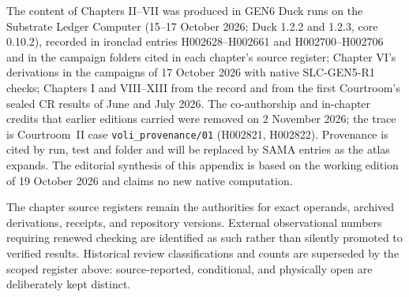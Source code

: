 The content of Chapters II--VII was produced in GEN6 Duck runs on the Substrate Ledger Computer (15--17 October 2026; Duck 1.2.2 and 1.2.3, core 0.10.2), recorded in ironclad entries H002628--H002661 and H002700--H002706 and in the campaign folders cited in each chapter's source register; Chapter VI's derivations in the campaigns of 17 October 2026 with native SLC-GEN5-R1 checks; Chapters I and VIII--XIII from the record and from the first Courtroom's sealed CR results of June and July 2026. The co-authorship and in-chapter credits that earlier editions carried were removed on 2 November 2026; the trace is Courtroom~II case \texttt{voli\_provenance/01} (H002821, H002822). Provenance is cited by run, test and folder and will be replaced by SAMA entries as the atlas expands. The editorial synthesis of this appendix is based on the working edition of 19 October 2026 and claims no new native computation.

The chapter source registers remain the authorities for exact operands, archived derivations, receipts, and repository versions. External observational numbers requiring renewed checking are identified as such rather than silently promoted to verified results. Historical review classifications and counts are superseded by the scoped register above: source-reported, conditional, and physically open are deliberately kept distinct.
